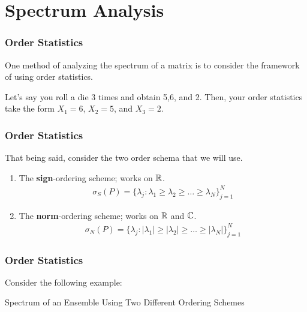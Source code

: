 \section{Spectrum Analysis}

\begin{frame} \frametitle{Order Statistics}

One method of analyzing the spectrum of a matrix is to consider the framework of using order statistics.

\begin{examples}
Let's say you roll a die 3 times and obtain 5,6, and 2.
Then, your order statistics take the form $X_1 = 6$, $X_2 = 5$, and $X_3 = 2$.
\end{examples}

\end{frame}


\begin{frame} \frametitle{Order Statistics}

That being said, consider the two order schema that we will use.

\begin{enumerate}
  \item The \textbf{sign}-ordering scheme; works on $\mathbb{R}$. \begin{align*}
  \sigma_S(P) = \{\lambda_j : \lambda_1 \geq \lambda_2 \geq \dots \geq \lambda_N\}_{j = 1}^N
  \end{align*}
  \item  The \textbf{norm}-ordering scheme; works on $\mathbb{R}$ and $\mathbb{C}$. \begin{align*}
  \sigma_N(P) = \{\lambda_j : |\lambda_1| \geq |\lambda_2| \geq \dots \geq |\lambda_N|\}_{j = 1}^N
  \end{align*}
\end{enumerate}

\end{frame}


\begin{frame} \frametitle{Order Statistics}

Consider the following example:

{Spectrum of an Ensemble Using Two Different Ordering Schemes}

\end{frame}

